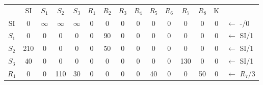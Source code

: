 \documentclass[12pt]{article}
\begin{document}
\begin{enumerate}
\begin{tabular}{|c|c|c|c|c|c|c|c|c|c|c|c|c|c|l}
\cline{1-14}
      & SI  & $S_1$                           & $S_2$                           & $S_3$                           & $R_1$                      & $R_2$                      & $R_3$                      & $R_4$                     & $R_5$                      & $R_6$                     & $R_7$                      & $R_8$                      & K                          &                        \\ \cline{1-14}
SI    & 0   & {\color[HTML]{000000} $\infty$} & {\color[HTML]{000000} $\infty$} & {\color[HTML]{000000} $\infty$} & {\color[HTML]{000000} 0}   & {\color[HTML]{000000} 0}   & {\color[HTML]{000000} 0}   & {\color[HTML]{000000} 0}  & {\color[HTML]{000000} 0}   & {\color[HTML]{000000} 0}  & {\color[HTML]{000000} 0}   & {\color[HTML]{000000} 0}   & {\color[HTML]{000000} 0}   & ${\leftarrow}$ -/0     \\ \cline{1-14}
$S_1$ & 0   & {\color[HTML]{000000} 0}        & {\color[HTML]{000000} 0}        & {\color[HTML]{000000} 0}        & {\color[HTML]{000000} 0}   & {\color[HTML]{000000} 90}  & {\color[HTML]{000000} 0}   & {\color[HTML]{000000} 0}  & {\color[HTML]{000000} 0}   & {\color[HTML]{000000} 0}  & {\color[HTML]{000000} 0}   & {\color[HTML]{000000} 0}   & {\color[HTML]{000000} 0}   & ${\leftarrow}$ SI/1    \\ \cline{1-14}
$S_2$ & 210 & {\color[HTML]{000000} 0}        & {\color[HTML]{000000} 0}        & {\color[HTML]{000000} 0}        & {\color[HTML]{000000} 0}   & {\color[HTML]{000000} 50}  & {\color[HTML]{000000} 0}   & {\color[HTML]{000000} 0}  & {\color[HTML]{000000} 0}   & {\color[HTML]{000000} 0}  & {\color[HTML]{000000} 0}   & {\color[HTML]{000000} 0}   & {\color[HTML]{000000} 0}   & ${\leftarrow}$ SI/1    \\ \cline{1-14}
$S_3$ & 40  & {\color[HTML]{000000} 0}        & {\color[HTML]{000000} 0}        & {\color[HTML]{000000} 0}        & {\color[HTML]{000000} 0}   & {\color[HTML]{000000} 0}   & {\color[HTML]{000000} 0}   & {\color[HTML]{000000} 0}  & {\color[HTML]{000000} 0}   & {\color[HTML]{000000} 0}  & {\color[HTML]{000000} 130} & {\color[HTML]{000000} 0}   & {\color[HTML]{000000} 0}   & ${\leftarrow}$ SI/1    \\ \cline{1-14}
$R_1$ & 0   & {\color[HTML]{000000} 0}        & {\color[HTML]{000000} 110}      & {\color[HTML]{000000} 30}       & {\color[HTML]{000000} 0}   & {\color[HTML]{000000} 0}   & {\color[HTML]{000000} 0}   & {\color[HTML]{000000} 0}  & {\color[HTML]{000000} 40}  & {\color[HTML]{000000} 0}  & {\color[HTML]{000000} 0}   & {\color[HTML]{000000} 50}  & {\color[HTML]{000000} 0}   & ${\leftarrow}$ $R_7$/3 \\ \cline{1-14}

\end{tabular}
\end{enumerate}
\end{document}
